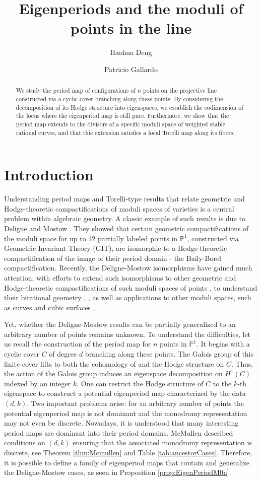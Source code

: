 \documentclass[12pt, letterpaper]{amsart}
\title{
Eigenperiods and the moduli of points in the line
}
\author{Haohua Deng}
\author{Patricio Gallardo}
\theoremstyle{plain}
\theoremstyle{definition}
\begin{document}
\begin{abstract}
We study the period map of configurations of $n$ points on the projective line constructed via a cyclic cover branching along these points. By considering the decomposition of its Hodge structure into eigenspaces, we establish the codimension of the locus where the eigenperiod map is still pure. Furthermore, we show that the period map extends to the divisors of a specific moduli space of weighted stable rational curves, and that this extension satisfies a local Torelli map along its fibers.
\end{abstract}
\maketitle
\section{Introduction}
Understanding period maps and Torelli-type results that relate geometric and Hodge-theoretic compactifications of moduli spaces of varieties is a central problem within algebraic geometry.  A classic example of such results is due to Deligne and Mostow \cite{DM86}. They showed that certain geometric compactifications of the moduli space for up to 12 partially labeled points in $\mathbb{P}^1$, constructed via Geometric Invariant Theory (GIT), are isomorphic to a Hodge-theoretic compactification of the image of their period domain - the Baily-Borel compactification. 
Recently, the Deligne-Mostow isomorphisms have gained much attention, with efforts to extend such isomorphisms to other geometric and Hodge-theoretic  compactifications of such moduli spaces of points \cite{gallardo2021geometric},
to understand their birational geometry
\cite{HM22}, \cite{hulek2024compactifications},  
as well as applications to other moduli spaces, such as curves and cubic surfaces \cite{Loo24}, \cite{casalaina2023birational}. 


Yet, whether the Deligne-Mostow results can be partially generalized to an arbitrary number of points remains unknown. To understand the difficulties, let us recall the construction of the period map for $n$ points in $\mathbb{P}^1$. It begins with a cyclic cover $C$ of degree $d$ branching along these points. The Galois group of this finite cover lifts to both the cohomology of and the Hodge structure on $C$. Thus, the action of the Galois group induces an eigenspace decomposition on $H^1(C)$ indexed by an integer $k$.  One can restrict the Hodge structure of $C$ to the $k$-th eigenspace to construct a potential eigenperiod map characterized by the data $(d,k)$. Two important problems arise: for an arbitrary number of points the potential eigenperiod map is not dominant and the monodromy representation may not even be discrete. Nowadays, it is understood that many interesting period maps are dominant into their period domains.  McMullen described conditions on $(d,k)$ ensuring that the associated monodromy representation is discrete, see Theorem \ref{thm:Mcmullen} and Table \ref{tab:ancestorCases}. Therefore, it is possible to define a family of eigenperiod maps that contain and generalize the Deligne-Mostow cases, as seen in Proposition \ref{prop:EigenPeriodM0n}.
\end{document}
